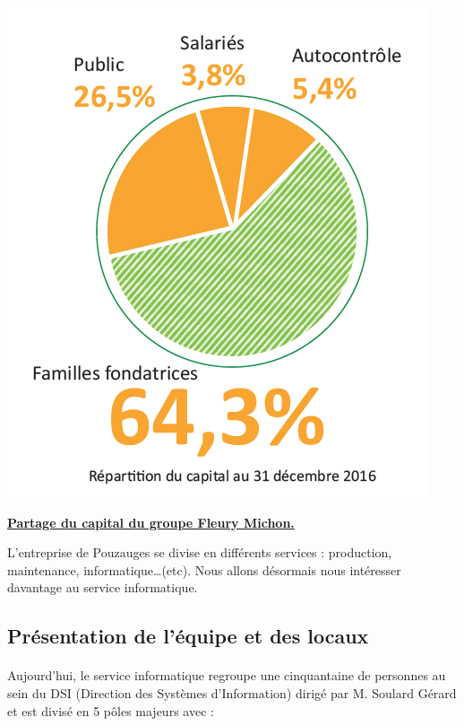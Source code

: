 \documentclass[a4paper,12pt]{extarticle}
\newcommand{\espace}{\vspace{0.3cm}}
\begin{document}
\centerline{\includegraphics[scale=0.6]{Img/Img_PartCapital.PNG}}
\centerline{\textbf{\underline{Partage du capital du groupe Fleury Michon.}}}
\espace{}

L’entreprise de Pouzauges se divise en différents services : production, maintenance, informatique…(etc). Nous allons désormais nous intéresser davantage au service informatique.

	\subsection{Présentation de l'équipe et des locaux}
		\paragraph{}
	
	Aujourd’hui, le service informatique regroupe une cinquantaine de personnes au sein du DSI (Direction des Systèmes d’Information) dirigé par M. Soulard Gérard et est divisé en 5 pôles majeurs avec : 
\end{document}
